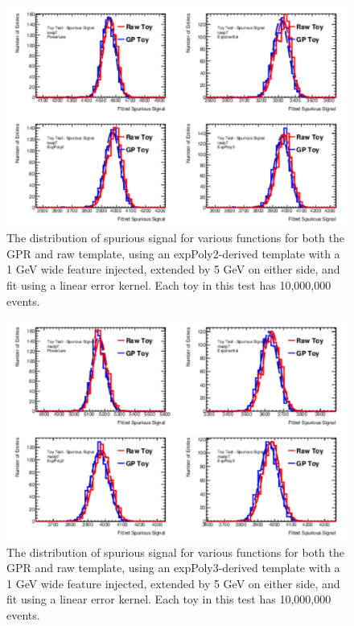 \begin{figure} 
\begin{center}
  \includegraphics[width=\textwidth]{figures/background/gpr/validation/linear/ToyTest_FitSigVals_lowpT_10M_Sig_1s}   
\caption{The distribution of spurious signal for various functions for both the GPR and raw template, using an expPoly2-derived template with a 1 GeV wide feature injected, extended by 5 GeV on either side, and fit using a linear error kernel. Each toy in this test has 10,000,000 events.}
\label{fig:linearkernel_lowpt_10M_Sig_1s}
\end{center}
\end{figure}

\begin{figure} 
\begin{center}
  \includegraphics[width=\textwidth]{figures/background/gpr/validation/linear/ToyTest_FitSigVals_medpT_10M_Sig_1s}   
\caption{The distribution of spurious signal for various functions for both the GPR and raw template, using an expPoly3-derived template with a 1 GeV wide feature injected, extended by 5 GeV on either side, and fit using a linear error kernel. Each toy in this test has 10,000,000 events.}
\label{fig:linearkernel_medpt_10M_Sig_1s}
\end{center}
\end{figure}

